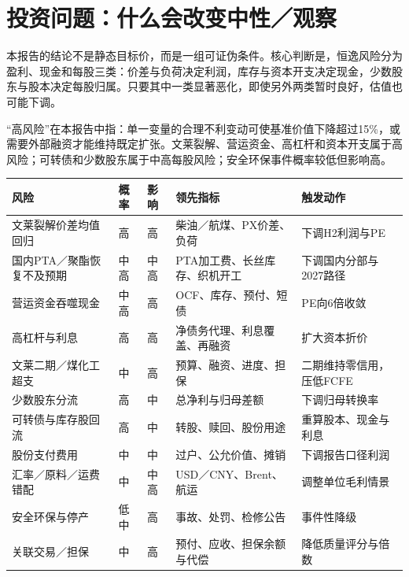 \section{投资问题：什么会改变中性／观察}

本报告的结论不是静态目标价，而是一组可证伪条件。核心判断是，恒逸风险分为盈利、现金和每股三类：价差与负荷决定利润，库存与资本开支决定现金，少数股东与股本决定每股归属。只要其中一类显著恶化，即使另外两类暂时良好，估值也可能下调。

“高风险”在本报告中指：单一变量的合理不利变动可使基准价值下降超过15\%，或需要外部融资才能维持既定扩张。文莱裂解、营运资金、高杠杆和资本开支属于高风险；可转债和少数股东属于中高每股风险；安全环保事件概率较低但影响高。

\begin{exhibitbox}[风险矩阵]
\scriptsize
\noindent\begin{tabularx}{\textwidth}{L{2.75cm}C{1.2cm}C{1.2cm}L{3.15cm}X}
\toprule
\textbf{风险} & \textbf{概率} & \textbf{影响} & \textbf{领先指标} & \textbf{触发动作} \\
\midrule
文莱裂解价差均值回归 & 高 & 高 & 柴油／航煤、PX价差、负荷 & 下调H2利润与PE \\
国内PTA／聚酯恢复不及预期 & 中高 & 中高 & PTA加工费、长丝库存、织机开工 & 下调国内分部与2027路径 \\
营运资金吞噬现金 & 中高 & 高 & OCF、库存、预付、短债 & PE向6倍收敛 \\
高杠杆与利息 & 高 & 高 & 净债务代理、利息覆盖、再融资 & 扩大资本折价 \\
文莱二期／煤化工超支 & 中 & 高 & 预算、融资、进度、担保 & 二期维持零信用，压低FCFE \\
少数股东分流 & 高 & 中 & 总净利与归母差额 & 下调归母转换率 \\
可转债与库存股回流 & 高 & 中 & 转股、赎回、股份用途 & 重算股本、现金与利息 \\
股份支付费用 & 中 & 中 & 过户、公允价值、摊销 & 下调报告口径利润 \\
汇率／原料／运费错配 & 中 & 中高 & USD／CNY、Brent、航运 & 调整单位毛利情景 \\
安全环保与停产 & 低中 & 高 & 事故、处罚、检修公告 & 事件性降级 \\
关联交易／担保 & 中 & 高 & 预付、应收、担保余额与代偿 & 降低质量评分与倍数 \\
\bottomrule
\end{tabularx}
\end{exhibitbox}

